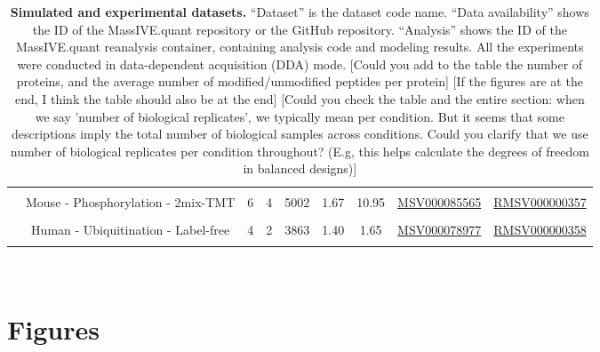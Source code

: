 \documentclass[mcp]{article}
\numberwithin{table}{section}
\def\todo#1{{\color{red}[#1]}}
\begin{document}
\begin{table}[ht]
\begin{tiny}
\begin{tabular}{|c|c|ccccc|cc|}
&&&&&&&& \\%
& Mouse - Phosphorylation - 2mix-TMT& 6 & 4 & 5002 & 1.67 & 10.95 & \href{https://massive.ucsd.edu/ProteoSAFe/dataset.jsp?task=4878d777c6b34cf8aaf8477e93140c4d}{MSV000085565} & \href{https://massive.ucsd.edu/ProteoSAFe/reanalysis_container.jsp?task=79406d32c1f9413daf7756e6eeb24968}{RMSV000000357}\\
&&&&&&&& \\%
& Human - Ubiquitination - Label-free & 4 & 2 & 3863 & 1.40 & 1.65 & \href{https://massive.ucsd.edu/ProteoSAFe/dataset.jsp?task=1b516164de5345108b40b75147dd58b5}{MSV000078977} & \href{https://massive.ucsd.edu/ProteoSAFe/reanalysis_container.jsp?task=f9e6117e00794ce5b2e8802601be16bc}{RMSV000000358}\\ [0.02in]
 &&&&&&&& \\
 \hline
\end{tabular}\\
\end{tiny}
\caption{ \small {\bf Simulated and experimental datasets.} 
``Dataset'' is the dataset code name.
``Data availability'' shows the ID of the MassIVE.quant repository or the GitHub repository. ``Analysis'' shows the ID of the MassIVE.quant reanalysis container, containing analysis code and modeling results. All the experiments were conducted in data-dependent acquisition (DDA) mode. \todo{Could you add to the table the number of proteins, and the average number of modified/unmodified peptides per protein} \todo{If the figures are at the end, I think the table should also be at the end}
\todo{Could you check the table and the entire section: when we say 'number of biological replicates', we typically mean per condition. But it seems that some descriptions imply the total number of biological samples across conditions. Could you clarify that we use number of biological replicates per condition throughout? (E.g, this helps calculate the degrees of freedom in balanced designs)}
}
\label{tab:dataDescription}
\end{table}

\newpage
\section{Figures}
\end{document}
